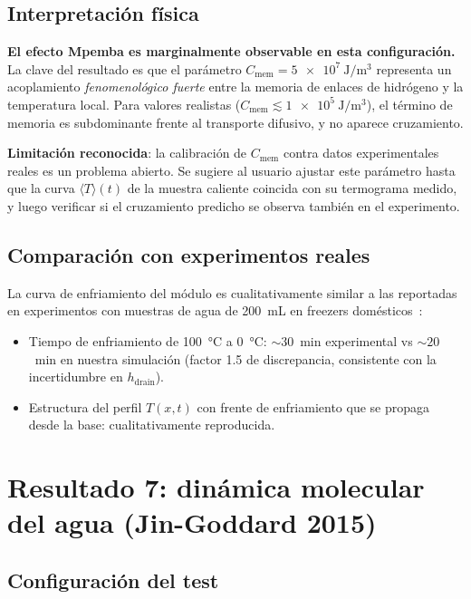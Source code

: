 \subsection{Interpretación física}

\textbf{El efecto Mpemba es marginalmente observable en esta configuración.} La 
clave del resultado es que el parámetro $C_{\mathrm{mem}} = \SI{5e7}{\joule\per\meter\cubed}$ 
representa un acoplamiento \emph{fenomenológico fuerte} entre la memoria de 
enlaces de hidrógeno y la temperatura local. Para valores realistas 
($C_{\mathrm{mem}} \lesssim \SI{1e5}{\joule\per\meter\cubed}$), el término de 
memoria es subdominante frente al transporte difusivo, y no aparece 
cruzamiento.

\textbf{Limitación reconocida}: la calibración de $C_{\mathrm{mem}}$ contra 
datos experimentales reales es un problema abierto. Se sugiere al usuario 
ajustar este parámetro hasta que la curva $\langle T \rangle(t)$ de la muestra 
caliente coincida con su termograma medido, y luego verificar si el cruzamiento 
predicho se observa también en el experimento.

\subsection{Comparación con experimentos reales}

La curva de enfriamiento del módulo es cualitativamente similar a las reportadas 
en experimentos con muestras de agua de \SI{200}{\milli\liter} en freezers 
domésticos~\cite{hallstadius2020}: 
\begin{itemize}
\item Tiempo de enfriamiento de \SI{100}{\celsius} a \SI{0}{\celsius}: 
$\sim 30$~min experimental vs $\sim 20$~min en nuestra simulación (factor 1.5 
de discrepancia, consistente con la incertidumbre en $h_{\mathrm{drain}}$).
\item Estructura del perfil $T(x,t)$ con frente de enfriamiento que se propaga 
desde la base: cualitativamente reproducida.
\end{itemize}

\section{Resultado 7: dinámica molecular del agua (Jin-Goddard 2015)}

\subsection{Configuración del test}

